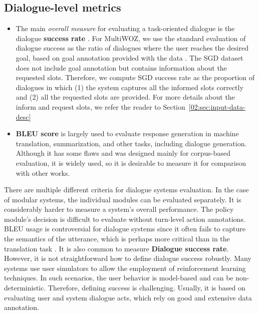\subsection{Dialogue-level metrics}
    \begin{itemize}
        \item The main \emph{overall measure} for evaluating a task-oriented dialogue is the dialogue \textbf{success rate} \cite{deriu_survey_2021}.
For MultiWOZ, we use the standard evaluation of dialogue success as the ratio of dialogues where the user reaches the desired goal, based on goal annotation provided with the data \cite{nekvinda-dusek-2021-shades}. 
The SGD dataset does not include goal annotation but contains information about the requested slots. Therefore, we compute SGD success rate as the proportion of dialogues in which (1) the system captures all the informed slots correctly and (2) all the requested slots are provided.
For more details about the inform and request slots, we refer the reader to Section~\ref{02:sec:input-data-desc}
    \item  \textbf{BLEU score} \cite{papineni-etal-2002-bleu} is largely used to evaluate response generation in machine translation, summarization, and other tasks, including dialogue generation.
    Although it has some flaws \cite{callison-burch-etal-2006-evaluating} and was designed mainly for corpus-based evaluation, it is widely used, so it is desirable to measure it for comparison with other works.
\end{itemize}

There are multiple different criteria for dialogue systems evaluation.
In the case of modular systems, the individual modules can be evaluated separately.
It is considerably harder to measure a system's overall performance.
The policy module's decision is difficult to evaluate without turn-level action annotations.
BLEU usage is controversial for dialogue systems since it often fails to capture the semantics of the utterance, which is perhaps more critical than in the translation task \cite{lowe2017towards}.
It is also common to measure \textbf{Dialogue success rate}.
However, it is not straightforward how to define dialogue success robustly.
Many systems use user simulators to allow the employment of reinforcement learning techniques.
In such scenarios, the user behavior is model-based and can be non-deterministic. Therefore, defining success is challenging.
Usually, it is based on evaluating user and system dialogue acts, which rely on good and extensive data annotation.

